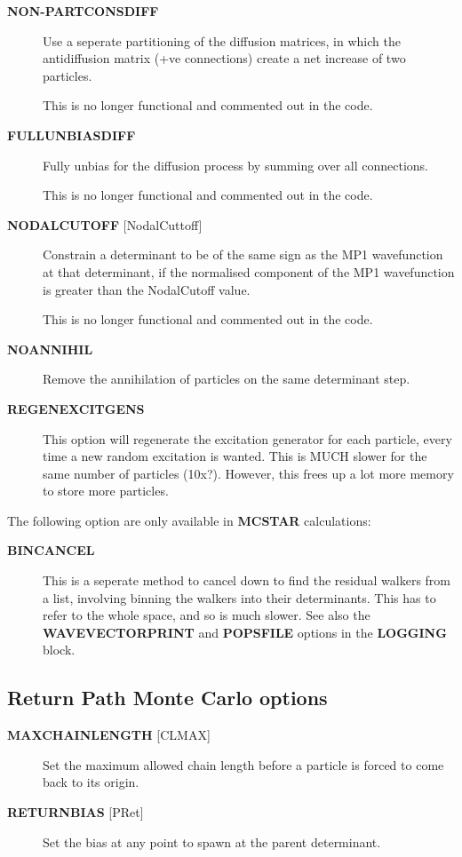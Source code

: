 \documentclass[openany,a4paper,10pt]{manual}
\begin{document}
\begin{description}
\item[\textbf{NON-PARTCONSDIFF}]
Use a seperate partitioning of the diffusion matrices, in which
the antidiffusion matrix (+ve connections) create a net increase of
two particles.

This is no longer functional and commented out in the code.

\item[\textbf{FULLUNBIASDIFF}]
Fully unbias for the diffusion process by summing over all connections.

This is no longer functional and commented out in the code.

\item[\textbf{NODALCUTOFF} {[}NodalCuttoff{]}]
Constrain a determinant to be of the same sign as the MP1
wavefunction at that determinant, if the normalised component of
the MP1 wavefunction is greater than the NodalCutoff value.

This is no longer functional and commented out in the code.

\item[\textbf{NOANNIHIL}]
Remove the annihilation of particles on the same
determinant step.

\item[\textbf{REGENEXCITGENS}]
This option will regenerate the excitation generator for each particle, every time a
new random excitation is wanted. This is MUCH slower for the same number of particles
(10x?). However, this frees up a lot more memory to store more particles.

\end{description}

The following option are only available in \textbf{MCSTAR} calculations:
\begin{description}
\item[\textbf{BINCANCEL}]
This is a seperate method to cancel down to find the residual
walkers from a list, involving binning the walkers into their
determinants. This has to refer to the whole space, and so is
much slower.  See also the \textbf{WAVEVECTORPRINT} and \textbf{POPSFILE}
options in the \textbf{LOGGING} block.

\end{description}


\subsection{Return Path Monte Carlo options}
\begin{description}
\item[\textbf{MAXCHAINLENGTH} {[}CLMAX{]}]
Set the maximum allowed chain length before a particle is forced to
come back to its origin.

\item[\textbf{RETURNBIAS} {[}PRet{]}]
Set the bias at any point to spawn at the parent determinant.

\end{description}
\end{document}
